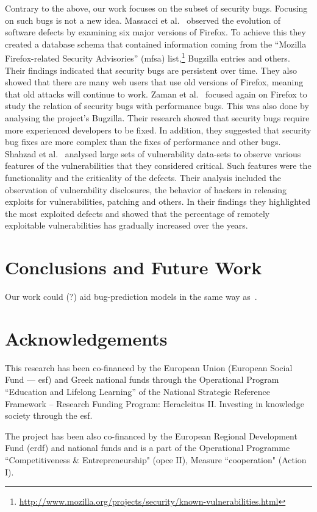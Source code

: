 \documentclass[conference]{llncs}
\begin{document}
Contrary to the above, our work focuses on the subset of security bugs.
Focusing on such bugs is not a new idea. Massacci et al.~\cite{MNN11} observed
the evolution of software defects by examining six major versions of Firefox.
To achieve this they created a database schema that contained information
coming from the ``Mozilla Firefox-related Security Advisories'' ({\sc mfsa})
list,\footnote{\url{http://www.mozilla.org/projects/security/known-vulnerabilities.html}}
Bugzilla entries and others. Their findings indicated that security bugs are
persistent over time. They also showed that there are many web users that use
old versions of Firefox, meaning that old attacks will continue to work.
Zaman et al.~\cite{ZAH11} focused again on Firefox to study the relation of
security bugs with performance bugs. This was also done by analysing the project's
Bugzilla. Their research showed that security bugs require more experienced developers
to be fixed. In addition, they suggested that security bug fixes are more complex than the
fixes of performance and other bugs.
Shahzad et al.~\cite{SSL12} analysed large sets of vulnerability data-sets to observe
various features of the vulnerabilities that they considered critical. Such features
were the functionality and the criticality of the defects. Their analysis
included the observation of vulnerability disclosures, the behavior of
hackers in releasing exploits for vulnerabilities, patching and others. In
their findings they highlighted the most exploited defects and showed that
the percentage of remotely exploitable vulnerabilities has gradually increased
over the years.

\section{Conclusions and Future Work}
\label{sec:con}

Our work could (?) aid bug-prediction models in the same way as~\cite{BN11}.

\section*{Acknowledgements}

This research has been co-financed by the European Union (European Social Fund
--– {\sc esf}) and Greek national funds through the Operational Program
``Education and Lifelong Learning'' of the National Strategic Reference Framework –
Research Funding Program: Heracleitus II. Investing in knowledge society
through the {\sc esf}.

The project has been also co-financed by the European Regional Development Fund ({\sc erdf})
and national funds and is a part of the Operational Programme ``Competitiveness \&
Entrepreneurship" ({\sc opce} II), Measure ``{\sc cooperation}" (Action I).


 
\end{document}
